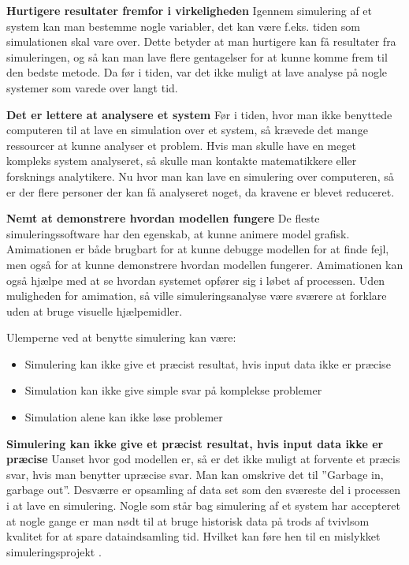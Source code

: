 \textbf{Hurtigere resultater fremfor i virkeligheden}
Igennem simulering af et system kan man bestemme nogle variabler, det kan være f.eks. tiden som simulationen skal vare over. Dette betyder at man hurtigere kan få resultater fra simuleringen, og så kan man lave flere gentagelser for at kunne komme frem til den bedste metode. Da før i tiden, var det ikke muligt at lave analyse på nogle systemer som varede over langt tid.

\vspace{5mm}

\textbf{Det er lettere at analysere et system}
Før i tiden, hvor man ikke benyttede computeren til at lave en simulation over et system, så krævede det mange ressourcer at kunne analyser et problem. Hvis man skulle have en meget kompleks system analyseret, så skulle man kontakte matematikkere eller forsknings analytikere. Nu hvor man kan lave en simulering over computeren, så er der flere personer der kan få analyseret noget, da kravene er blevet reduceret.

\vspace{5mm}

\textbf{Nemt at demonstrere hvordan modellen fungere}
 De fleste simuleringssoftware har den egenskab, at kunne animere model grafisk. Amimationen er både brugbart for at kunne debugge modellen for at finde fejl, men også for at kunne demonstrere hvordan modellen fungerer. Amimationen kan også hjælpe med at se hvordan systemet opfører sig i løbet af processen. Uden muligheden for amimation, så ville simuleringsanalyse være sværere at forklare uden at bruge visuelle hjælpemidler.



\vspace{5mm}
Ulemperne ved at benytte simulering kan være:
\begin{itemize}
\item Simulering kan ikke give et præcist resultat, hvis input data ikke er præcise
\item Simulation kan ikke give simple svar på komplekse problemer
\item Simulation alene kan ikke løse problemer
\end{itemize}

\vspace{5mm}

\textbf{Simulering kan ikke give et præcist resultat, hvis input data ikke er præcise}
Uanset hvor god modellen er, så er det ikke muligt at forvente et præcis svar, hvis man benytter upræcise svar. Man kan omskrive det til ”Garbage in, garbage out”. Desværre er opsamling af data set som den sværeste del i processen i at lave en simulering. Nogle som står bag simulering af et system har accepteret at nogle gange er man nødt til at bruge historisk data på trods af tvivlsom kvalitet for at spare dataindsamling tid. Hvilket kan føre hen til en mislykket simuleringsprojekt \cite[s. 16-20]{SimulationHandbook}.


